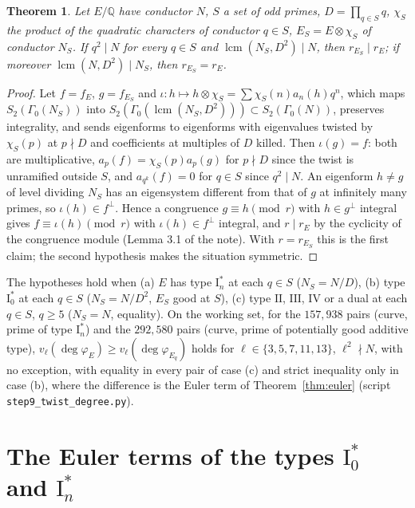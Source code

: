 \documentclass[11pt]{amsart}
\newtheorem{theorem}{Theorem}[section]
\theoremstyle{definition}
\newcommand{\Q}{\mathbb{Q}}\newcommand{\Z}{\mathbb{Z}}\newcommand{\F}{\mathbb{F}}
\newcommand{\degphi}{\deg\varphi_E}\newcommand{\Gal}{\operatorname{Gal}}\newcommand{\ad}{\operatorname{ad}^0}
\begin{document}
\begin{theorem}\label{thm:twist}
Let $E/\Q$ have conductor $N$, $S$ a set of odd primes, $D=\prod_{q\in S}q$, $\chi_S$ the product of the quadratic characters of conductor $q\in S$, $E_S=E\otimes\chi_S$ of conductor $N_S$. If $q^2\mid N$ for every $q\in S$ and $\operatorname{lcm}(N_S,D^2)\mid N$, then $r_{E_S}\mid r_E$; if moreover $\operatorname{lcm}(N,D^2)\mid N_S$, then $r_{E_S}=r_E$.
\end{theorem}
\begin{proof}
Let $f=f_E$, $g=f_{E_S}$ and $\iota\colon h\mapsto h\otimes\chi_S=\sum\chi_S(n)a_n(h)q^n$, which maps $S_2(\Gamma_0(N_S))$ into $S_2(\Gamma_0(\operatorname{lcm}(N_S,D^2)))\subset S_2(\Gamma_0(N))$, preserves integrality, and sends eigenforms to eigenforms with eigenvalues twisted by $\chi_S(p)$ at $p\nmid D$ and coefficients at multiples of $D$ killed. Then $\iota(g)=f$: both are multiplicative, $a_p(f)=\chi_S(p)a_p(g)$ for $p\nmid D$ since the twist is unramified outside $S$, and $a_{q^k}(f)=0$ for $q\in S$ since $q^2\mid N$. An eigenform $h\ne g$ of level dividing $N_S$ has an eigensystem different from that of $g$ at infinitely many primes, so $\iota(h)\in f^\perp$. Hence a congruence $g\equiv h\pmod r$ with $h\in g^\perp$ integral gives $f\equiv\iota(h)\pmod r$ with $\iota(h)\in f^\perp$ integral, and $r\mid r_E$ by the cyclicity of the congruence module (Lemma 3.1 of the note). With $r=r_{E_S}$ this is the first claim; the second hypothesis makes the situation symmetric.
\end{proof}
The hypotheses hold when (a) $E$ has type $\mathrm{I}_n^*$ at each $q\in S$ ($N_S=N/D$), (b) type $\mathrm{I}_0^*$ at each $q\in S$ ($N_S=N/D^2$, $E_S$ good at $S$), (c) type $\mathrm{II}$, $\mathrm{III}$, $\mathrm{IV}$ or a dual at each $q\in S$, $q\ge5$ ($N_S=N$, equality). On the working set, for the $157{,}938$ pairs (curve, prime of type $\mathrm{I}_n^*$) and the $292{,}580$ pairs (curve, prime of potentially good additive type), $v_\ell(\degphi)\ge v_\ell(\deg\varphi_{E_q})$ holds for $\ell\in\{3,5,7,11,13\}$, $\ell^2\nmid N$, with no exception, with equality in every pair of case (c) and strict inequality only in case (b), where the difference is the Euler term of Theorem~\ref{thm:euler} (script \texttt{step9\_twist\_degree.py}).

\section{The Euler terms of the types \texorpdfstring{$\mathrm{I}_0^*$ and $\mathrm{I}_n^*$}{I0* and In*}}\label{sec:proved}
\end{document}
